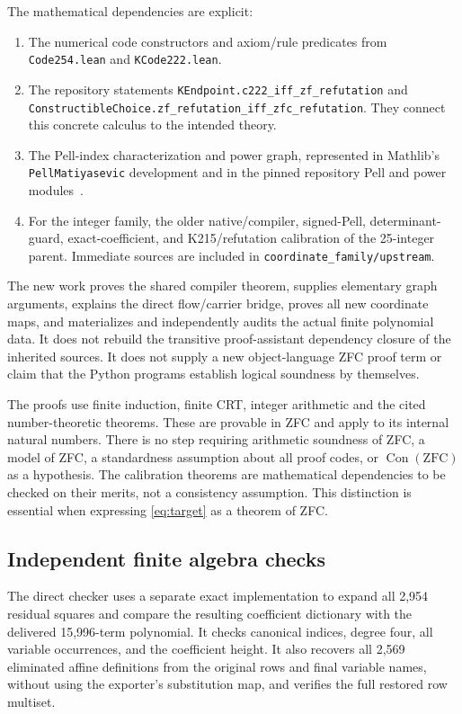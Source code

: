 \documentclass[11pt,letterpaper]{article}
\newcommand{\Con}{\operatorname{Con}}
\newcommand{\ZFC}{\mathrm{ZFC}}
\newcommand{\file}[1]{\nolinkurl{#1}}
\begin{document}
The mathematical dependencies are explicit:
\begin{enumerate}
\item The numerical code constructors and axiom/rule predicates from
      \file{Code254.lean} and \file{KCode222.lean}.
\item The repository statements
      \file{KEndpoint.c222_iff_zf_refutation} and
      \file{ConstructibleChoice.zf_refutation_iff_zfc_refutation}.
      They connect this concrete calculus to the intended theory.
\item The Pell-index characterization and power graph, represented in
      Mathlib's \file{PellMatiyasevic} development and in the pinned
      repository Pell and power modules~\cite{pell,carneiro}.
\item For the integer family, the older native/compiler, signed-Pell,
      determinant-guard, exact-coefficient, and K215/refutation calibration
      of the 25-integer parent. Immediate sources are included in
      \file{coordinate_family/upstream}.
\end{enumerate}
The new work proves the shared compiler theorem, supplies elementary
graph arguments, explains the direct flow/carrier bridge, proves all new
coordinate maps, and materializes and independently audits the actual
finite polynomial data. It does not rebuild the transitive proof-assistant
dependency closure of the inherited sources. It does not supply a new
object-language ZFC proof term or claim that the Python programs establish
logical soundness by themselves.

The proofs use finite induction, finite CRT, integer arithmetic and the
cited number-theoretic theorems. These are provable in ZFC and apply to
its internal natural numbers. There is no step requiring arithmetic
soundness of ZFC, a model of ZFC, a standardness assumption about all
proof codes, or $\Con(\ZFC)$ as a hypothesis. The calibration theorems
are mathematical dependencies to be checked on their merits, not a
consistency assumption. This distinction is essential when expressing
\eqref{eq:target} as a theorem of ZFC.

\subsection{Independent finite algebra checks}

The direct checker uses a separate exact implementation to expand all
2,954 residual squares and compare the resulting coefficient dictionary
with the delivered 15,996-term polynomial. It checks canonical indices,
degree four, all variable occurrences, and the coefficient height. It
also recovers all 2,569 eliminated affine definitions from the original
rows and final variable names, without using the exporter's substitution
map, and verifies the full restored row multiset.
\end{document}
